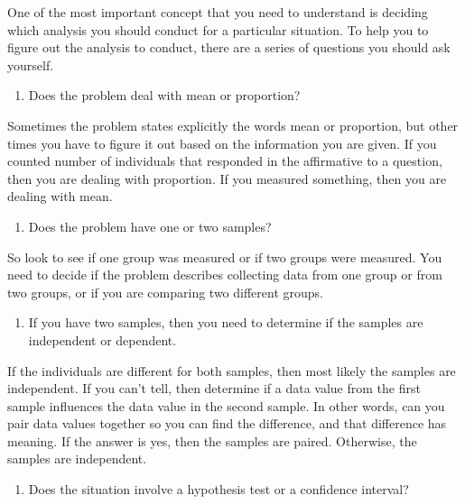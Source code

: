 \documentclass[
]{book}
\providecommand{\tightlist}{%
  \setlength{\itemsep}{0pt}\setlength{\parskip}{0pt}}
\begin{document}
One of the most important concept that you need to understand is deciding which analysis you should conduct for a particular situation. To help you to figure out the analysis to conduct, there are a series of questions you should ask yourself.

\begin{enumerate}
\def\labelenumi{\arabic{enumi}.}
\tightlist
\item
  Does the problem deal with mean or proportion?
\end{enumerate}

Sometimes the problem states explicitly the words mean or proportion, but other times you have to figure it out based on the information you are given. If you counted number of individuals that responded in the affirmative to a question, then you are dealing with proportion. If you measured something, then you are dealing with mean.

\begin{enumerate}
\def\labelenumi{\arabic{enumi}.}
\setcounter{enumi}{1}
\tightlist
\item
  Does the problem have one or two samples?
\end{enumerate}

So look to see if one group was measured or if two groups were measured. You need to decide if the problem describes collecting data from one group or from two groups, or if you are comparing two different groups.

\begin{enumerate}
\def\labelenumi{\arabic{enumi}.}
\setcounter{enumi}{2}
\tightlist
\item
  If you have two samples, then you need to determine if the samples are independent or dependent.
\end{enumerate}

If the individuals are different for both samples, then most likely the samples are independent. If you can't tell, then determine if a data value from the first sample influences the data value in the second sample. In other words, can you pair data values together so you can find the difference, and that difference has meaning. If the answer is yes, then the samples are paired. Otherwise, the samples are independent.

\begin{enumerate}
\def\labelenumi{\arabic{enumi}.}
\setcounter{enumi}{3}
\tightlist
\item
  Does the situation involve a hypothesis test or a confidence interval?
\end{enumerate}
\end{document}
